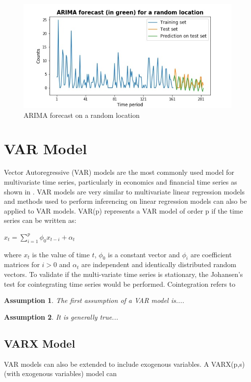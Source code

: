 \documentclass[10pt, letterpaper] {article}
\newtheorem{assumption}{Assumption}
\begin{document}
\begin{figure}[H]
    \centering
    \includegraphics[width=\textwidth]{Images/forecast_example.jpg}
    \caption{ARIMA forecast on a random location}
    \label{fig:ARIMA forecast on a random location}
\end{figure}



\section{VAR Model}
Vector Autoregressive (VAR) models are the most commonly used model for multivariate time series, particularly in economics and financial time series as shown in \cite{Hilde2000}. VAR models are very similar to multivariate linear regression models and methods used to perform inferencing on linear regression models can also be applied to VAR models. VAR(p) represents a VAR model of order p if the time series can be written as: 

\begin{center}
    $\displaystyle x_t=\sum_{i=1}^{p} \phi_{0}x_{t-i}+\alpha_t$
\end{center}

where $x_t$ is the value of time $t$, $\phi_0$ is a constant vector and $\phi_i$ are coefficient matrices for $i>0$ and $\alpha_t$ are independent and identically distributed random vectors. 
To validate if the multi-variate time series is stationary, the Johansen's test for cointegrating time series would be performed. Cointegration refers to 
\begin{assumption}
The first assumption of a VAR model is....
\end{assumption}
\begin{assumption}
It is generally true...
\end{assumption}

\subsection{VARX Model}
VAR models can also be extended to include exogenous variables. A VARX(p,s) (with exogenous variables) model can 
\end{document}
